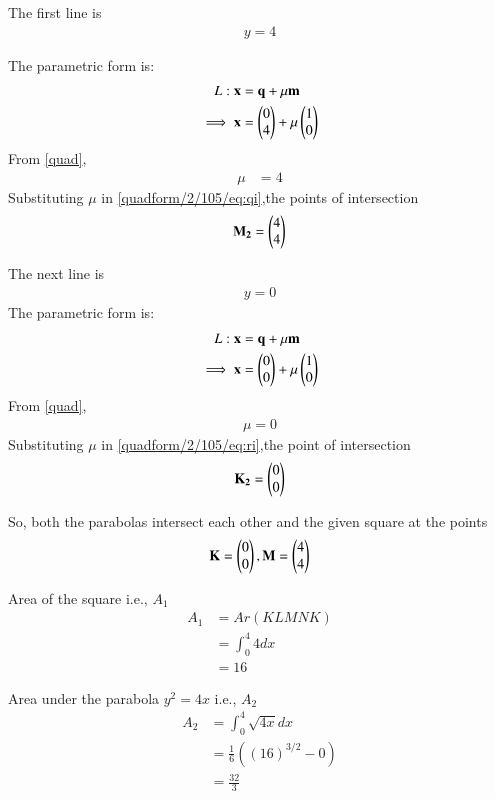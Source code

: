 \documentclass[journal,12pt,twocolumn]{IEEEtran}
\begin{document}
The first line is
\begin{align} 
y=4
\end{align}

 The parametric form is:
\begin{align} 
L: \mathbf{x}&=\mathbf{q}+\mu\mathbf{m}
\\
\implies \mathbf{x}&=\begin{pmatrix}0\\4\end{pmatrix}+\mu\begin{pmatrix}1\\0\end{pmatrix} \label{quadform/2/105/eq:qi}
\end{align}
From  \eqref{quad},
\begin{align}
\mu &= 4
\end{align}
Substituting $\mu$ in \eqref{quadform/2/105/eq:qi},the points of intersection
\begin{align}
 \mathbf{M_2}= \begin{pmatrix}4\\4\end{pmatrix}
\end{align}

The next line is 
\begin{align} 
y=0
\end{align}
The parametric form is:
\begin{align} 
L: \mathbf{x}&=\mathbf{q}+\mu\mathbf{m}
\\
\implies \mathbf{x}&=\begin{pmatrix}0\\0\end{pmatrix}+\mu\begin{pmatrix}1\\0\end{pmatrix} \label{quadform/2/105/eq:ri}
\end{align}
From  \eqref{quad},
\begin{align}
\mu = 0
\end{align}
Substituting $\mu$ in \eqref{quadform/2/105/eq:ri},the point of intersection
\begin{align}
 \mathbf{K_2}= \begin{pmatrix}0\\0\end{pmatrix}
\end{align}

So, both the parabolas intersect each other and the given square at the points 
\begin{align}
 \mathbf{K}= \begin{pmatrix}0\\0\end{pmatrix},
 \mathbf{M}= \begin{pmatrix}4\\4\end{pmatrix}
\end{align}


Area of the square i.e., $A_1$ 
\begin{align}
    A_1 &= Ar(KLMNK)\\
    &= \int_0^4 4dx\\
    &= 16
\end{align}

Area under the parabola $y^2 = 4x$ i.e., $A_2$
\begin{align}
    A_2 &= \int_0^4 \sqrt{4x} dx\\
   &= \frac{1}{6}((16)^{3/2} - 0)\\
   &= \frac{32}{3}
\end{align}
\end{document}
